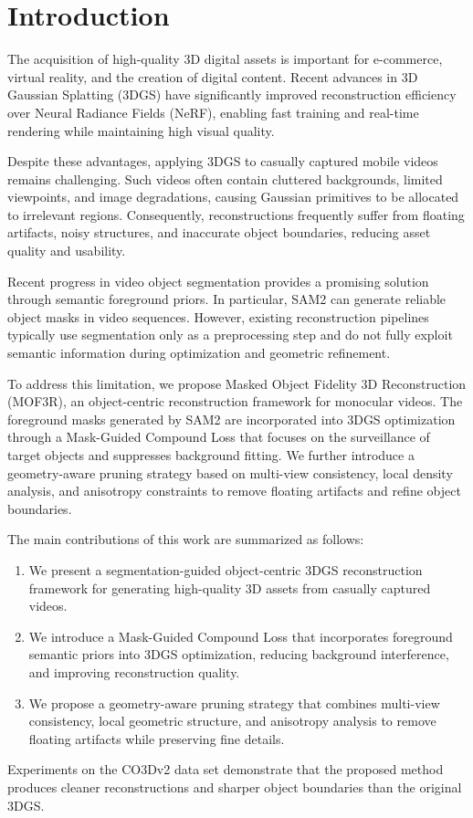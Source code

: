 \section{Introduction}

The acquisition of high-quality 3D digital assets is important for e-commerce, virtual reality, and the creation of digital content. Recent advances in 3D Gaussian Splatting (3DGS) have significantly improved reconstruction efficiency over Neural Radiance Fields (NeRF), enabling fast training and real-time rendering while maintaining high visual quality.

Despite these advantages, applying 3DGS to casually captured mobile videos remains challenging. Such videos often contain cluttered backgrounds, limited viewpoints, and image degradations, causing Gaussian primitives to be allocated to irrelevant regions. Consequently, reconstructions frequently suffer from floating artifacts, noisy structures, and inaccurate object boundaries, reducing asset quality and usability.

Recent progress in video object segmentation provides a promising solution through semantic foreground priors. In particular, SAM2 can generate reliable object masks in video sequences. However, existing reconstruction pipelines typically use segmentation only as a preprocessing step and do not fully exploit semantic information during optimization and geometric refinement.

To address this limitation, we propose Masked Object Fidelity 3D Reconstruction (MOF3R), an object-centric reconstruction framework for monocular videos. The foreground masks generated by SAM2 are incorporated into 3DGS optimization through a Mask-Guided Compound Loss that focuses on the surveillance of target objects and suppresses background fitting. We further introduce a geometry-aware pruning strategy based on multi-view consistency, local density analysis, and anisotropy constraints to remove floating artifacts and refine object boundaries.

The main contributions of this work are summarized as follows:

\begin{enumerate}
\item We present a segmentation-guided object-centric 3DGS reconstruction framework for generating high-quality 3D assets from casually captured videos.

\item We introduce a Mask-Guided Compound Loss that incorporates foreground semantic priors into 3DGS optimization, reducing background interference, and improving reconstruction quality.

\item We propose a geometry-aware pruning strategy that combines multi-view consistency, local geometric structure, and anisotropy analysis to remove floating artifacts while preserving fine details.

\end{enumerate}

Experiments on the CO3Dv2 data set demonstrate that the proposed method produces cleaner reconstructions and sharper object boundaries than the original 3DGS.

